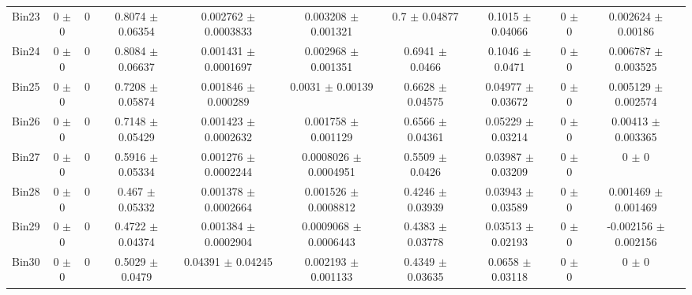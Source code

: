 \begin{tabular}{@{\extracolsep{4pt}}lccccccccc@{}}
     Bin23 & 0 $\pm$ 0 & 0 & 0.8074 $\pm$ 0.06354 & 0.002762 $\pm$ 0.0003833 & 0.003208 $\pm$ 0.001321 & 0.7 $\pm$ 0.04877 & 0.1015 $\pm$ 0.04066 & 0 $\pm$ 0 & 0.002624 $\pm$ 0.00186 \\ 
     Bin24 & 0 $\pm$ 0 & 0 & 0.8084 $\pm$ 0.06637 & 0.001431 $\pm$ 0.0001697 & 0.002968 $\pm$ 0.001351 & 0.6941 $\pm$ 0.0466 & 0.1046 $\pm$ 0.0471 & 0 $\pm$ 0 & 0.006787 $\pm$ 0.003525 \\ 
     Bin25 & 0 $\pm$ 0 & 0 & 0.7208 $\pm$ 0.05874 & 0.001846 $\pm$ 0.000289 & 0.0031 $\pm$ 0.00139 & 0.6628 $\pm$ 0.04575 & 0.04977 $\pm$ 0.03672 & 0 $\pm$ 0 & 0.005129 $\pm$ 0.002574 \\ 
     Bin26 & 0 $\pm$ 0 & 0 & 0.7148 $\pm$ 0.05429 & 0.001423 $\pm$ 0.0002632 & 0.001758 $\pm$ 0.001129 & 0.6566 $\pm$ 0.04361 & 0.05229 $\pm$ 0.03214 & 0 $\pm$ 0 & 0.00413 $\pm$ 0.003365 \\ 
     Bin27 & 0 $\pm$ 0 & 0 & 0.5916 $\pm$ 0.05334 & 0.001276 $\pm$ 0.0002244 & 0.0008026 $\pm$ 0.0004951 & 0.5509 $\pm$ 0.0426 & 0.03987 $\pm$ 0.03209 & 0 $\pm$ 0 & 0 $\pm$ 0 \\ 
     Bin28 & 0 $\pm$ 0 & 0 & 0.467 $\pm$ 0.05332 & 0.001378 $\pm$ 0.0002664 & 0.001526 $\pm$ 0.0008812 & 0.4246 $\pm$ 0.03939 & 0.03943 $\pm$ 0.03589 & 0 $\pm$ 0 & 0.001469 $\pm$ 0.001469 \\ 
     Bin29 & 0 $\pm$ 0 & 0 & 0.4722 $\pm$ 0.04374 & 0.001384 $\pm$ 0.0002904 & 0.0009068 $\pm$ 0.0006443 & 0.4383 $\pm$ 0.03778 & 0.03513 $\pm$ 0.02193 & 0 $\pm$ 0 & -0.002156 $\pm$ 0.002156 \\ 
     Bin30 & 0 $\pm$ 0 & 0 & 0.5029 $\pm$ 0.0479 & 0.04391 $\pm$ 0.04245 & 0.002193 $\pm$ 0.001133 & 0.4349 $\pm$ 0.03635 & 0.0658 $\pm$ 0.03118 & 0 $\pm$ 0 & 0 $\pm$ 0 \\ 
\hline\hline
  \end{tabular}
